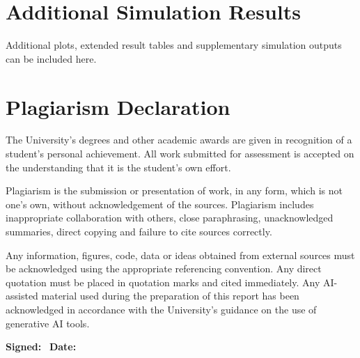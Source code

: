 \documentclass[12pt,a4paper]{article}
\begin{document}
\section{Additional Simulation Results}
\label{app:extra}

Additional plots, extended result tables and supplementary simulation
outputs can be included here.

\newpage
\section*{Plagiarism Declaration}

The University's degrees and other academic awards are given in
recognition of a student's personal achievement. All work submitted for
assessment is accepted on the understanding that it is the student's own
effort.

Plagiarism is the submission or presentation of work, in any form, which
is not one's own, without acknowledgement of the sources. Plagiarism
includes inappropriate collaboration with others, close paraphrasing,
unacknowledged summaries, direct copying and failure to cite sources
correctly.

Any information, figures, code, data or ideas obtained from external
sources must be acknowledged using the appropriate referencing convention.
Any direct quotation must be placed in quotation marks and cited
immediately. Any AI-assisted material used during the preparation of this
report has been acknowledged in accordance with the University's guidance
on the use of generative AI tools.

\vspace{2cm}
\noindent\textbf{Signed:}~\underline{\hspace{6cm}}
\hfill
\textbf{Date:}~\underline{\hspace{3cm}}
\end{document}

